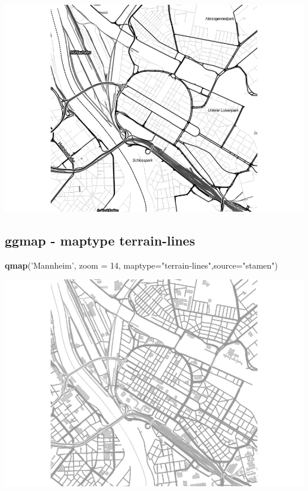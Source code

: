 \documentclass[]{article}
\newenvironment{Shaded}{\begin{snugshade}}{\end{snugshade}}
\newcommand{\KeywordTok}[1]{\textcolor[rgb]{0.13,0.29,0.53}{\textbf{{#1}}}}
\newcommand{\DataTypeTok}[1]{\textcolor[rgb]{0.13,0.29,0.53}{{#1}}}
\newcommand{\DecValTok}[1]{\textcolor[rgb]{0.00,0.00,0.81}{{#1}}}
\newcommand{\StringTok}[1]{\textcolor[rgb]{0.31,0.60,0.02}{{#1}}}
\newcommand{\NormalTok}[1]{{#1}}
\begin{document}
\includegraphics{Intro_Datenanalyse1_files/figure-latex/unnamed-chunk-255-1.pdf}

\subsection{ggmap - maptype
terrain-lines}\label{ggmap---maptype-terrain-lines}

\begin{Shaded}
\begin{Highlighting}[]
\KeywordTok{qmap}\NormalTok{(}\StringTok{'Mannheim'}\NormalTok{, }\DataTypeTok{zoom =} \DecValTok{14}\NormalTok{,}
 \DataTypeTok{maptype=}\StringTok{"terrain-lines"}\NormalTok{,}\DataTypeTok{source=}\StringTok{"stamen"}\NormalTok{)}
\end{Highlighting}
\end{Shaded}

\includegraphics{Intro_Datenanalyse1_files/figure-latex/unnamed-chunk-256-1.pdf}
\end{document}
